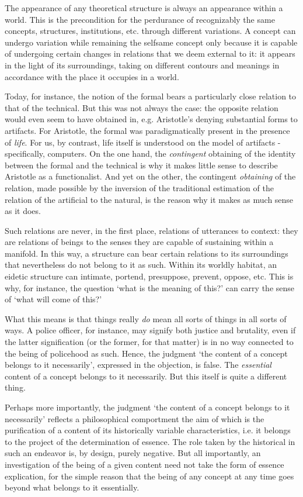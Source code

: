 \documentclass[]{article}
\begin{document}
The appearance of any theoretical structure is always an appearance within a world. This is the precondition for the perdurance of recognizably the same concepts, structures, institutions, etc. through different variations. A concept can undergo variation while remaining the selfsame concept only because it is capable of undergoing certain changes in relations that we deem external to it: it appears in the light of its surroundings, taking on different contours and meanings in accordance with the place it occupies in a world. 

Today, for instance, the notion of the formal bears a particularly close relation to that of the technical. But this was not always the case: the opposite relation would even seem to have obtained in, e.g. Aristotle's denying substantial forms to artifacts. For Aristotle, the formal was paradigmatically present in the presence of \textit{life}. For us, by contrast, life itself is understood on the model of artifacts - specifically, computers. On the one hand, the \textit{contingent} obtaining of the identity between the formal and the technical is why it makes little sense to describe Aristotle as a functionalist. And yet on the other, the contingent \textit{obtaining} of the relation, made possible by the inversion of the traditional estimation of the relation of the artificial to the natural, is the reason why it makes as much sense as it does.

Such relations are never, in the first place, relations of utterances to context: they are relations of beings to the senses they are capable of sustaining within a manifold. In this way, a structure can bear certain relations to its surroundings that nevertheless do not belong to it as such. Within its worldly habitat, an eidetic structure can intimate, portend, presuppose, prevent, oppose, etc. This is why, for instance, the question `what is the meaning of this?' can carry the sense of `what will come of this?'

What this means is that things really \textit{do} mean all sorts of things in all sorts of ways. A police officer, for instance, may signify both justice and brutality, even if the latter signification (or the former, for that matter) is in no way connected to the being of policehood as such. Hence, the judgment `the content of a concept belongs to it necessarily', expressed in the objection, is false. The \textit{essential} content of a concept belongs to it necessarily. But this itself is quite a different thing.

Perhaps more importantly, the judgment `the content of a concept belongs to it necessarily' reflects a philosophical comportment the aim of which is the purification of a content of its historically variable characteristics, i.e. it belongs to the project of the determination of essence. The role taken by the historical in such an endeavor is, by design, purely negative. But all importantly, an investigation of the being of a given content need not take the form of essence explication, for the simple reason that the being of any concept at any time goes beyond what belongs to it essentially.
\end{document}
